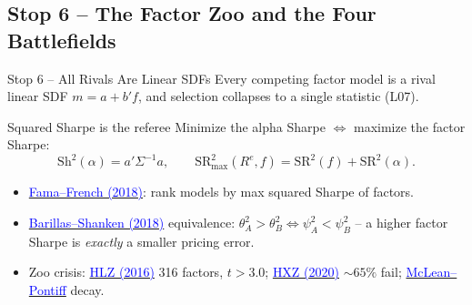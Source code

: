 \documentclass{beamer}
\begin{document}
\subsection{Stop 6 -- The Factor Zoo and the Four Battlefields}

\begin{frame}{Stop 6 -- All Rivals Are Linear SDFs}
Every competing factor model is a \alert{rival linear SDF} $m=a+b'f$, and selection collapses to a single statistic (L07).
\begin{block}{Squared Sharpe is the referee}
Minimize the alpha Sharpe $\Longleftrightarrow$ maximize the factor Sharpe:
\[
\mathrm{Sh}^2(\alpha)=a'\Sigma^{-1}a,
\qquad
\mathrm{SR}^2_{\max}(R^e,f)=\mathrm{SR}^2(f)+\mathrm{SR}^2(\alpha).
\]
\end{block}
\begin{itemize}
  \item \href{https://doi.org/10.1016/j.jfineco.2018.02.012}{\textcolor{blue}{Fama--French (2018)}}: rank models by max squared Sharpe of factors.
  \item \href{https://doi.org/10.1111/jofi.12607}{\textcolor{blue}{Barillas--Shanken (2018)}} equivalence: $\theta_A^2>\theta_B^2 \Leftrightarrow \psi_A^2<\psi_B^2$ -- a higher factor Sharpe is \emph{exactly} a smaller pricing error.
  \item \alert{Zoo crisis:} \href{https://doi.org/10.1093/rfs/hhv059}{\textcolor{blue}{HLZ (2016)}} 316 factors, $t>3.0$; \href{https://doi.org/10.1093/rfs/hhy131}{\textcolor{blue}{HXZ (2020)}} $\sim 65\%$ fail; \href{https://doi.org/10.1111/jofi.12365}{\textcolor{blue}{McLean--Pontiff}} decay.
\end{itemize}
\end{frame}
\end{document}

